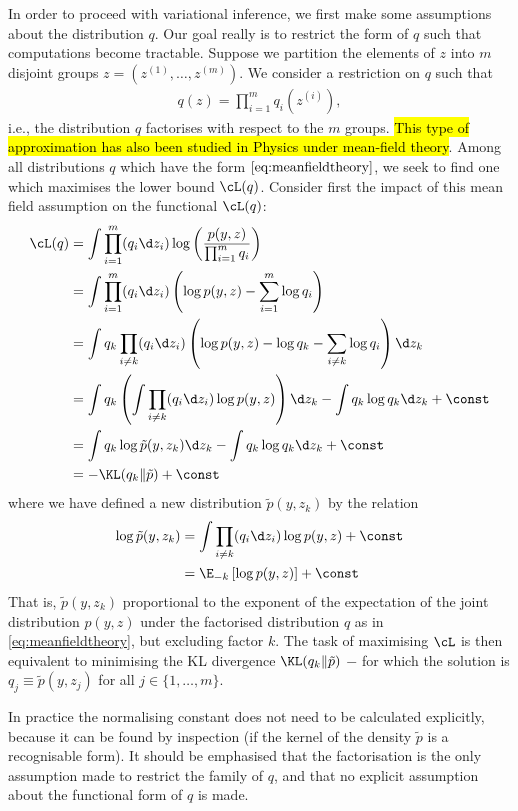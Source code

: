 In order to proceed with variational inference, we first make some assumptions about the distribution $q$. Our goal really is to restrict the form of $q$ such that computations become tractable. Suppose we partition the elements of $z$ into $m$ disjoint groups $z = (z^{(1)}, \dots, z^{(m)})$. We consider a restriction on $q$ such that
\begin{align}\label{eq:meanfieldtheory}
  q(z) = \prod_{i=1}^m q_i(z^{(i)}),
\end{align}
i.e., the distribution $q$ factorises with respect to the $m$ groups. \hl{This type of approximation has also been studied in Physics under mean-field theory}. Among all distributions $q$ which have the form $\eqref{eq:meanfieldtheory}$, we seek to find one which maximises the lower bound $\cL(q)$. Consider first the impact of this mean field assumption on the functional $\cL(q)$:
\begin{align*}
  \cL(q) &= \int \prod_{i=1}^m (q_i \d z_i) \log \left( \frac{p(y,z)}{\prod_{i=1}^m q_i} \right)  \\
  &= \int \prod_{i=1}^m (q_i \d z_i) \left( \log p(y,z) - \sum_{i=1}^m\log  q_i \right) \\
  &= \int q_k \prod_{i \neq k} (q_i \d z_i) \left( \log p(y,z) - \log q_k - \sum_{i \neq k} \log  q_i \right) \d z_k \\
  &= \int q_k  \left(\int \prod_{i \neq k} (q_i \d z_i) \log p(y,z) \right) \d z_k - \int q_k \log q_k  \d z_k + \const \\
  &= \int q_k \log \tilde p(y,z_k) \d z_k - \int q_k \log q_k  \d z_k + \const \\
  &= -\KL (q_k \Vert \tilde p) + \const
\end{align*}
where we have defined a new distribution $\tilde p(y,z_k)$ by the relation
\begin{align*}
  \log \tilde p(y,z_k) 
  &= \int \prod_{i \neq k} (q_i \d z_i) \log p(y,z) + \const \\
  &= \E_{-k}\left[ \log p(y,z) \right] + \const
\end{align*}
That is, $\tilde p(y,z_k)$ proportional to the exponent of the expectation of the joint distribution $p(y,z)$ under the factorised distribution $q$ as in \eqref{eq:meanfieldtheory}, but excluding factor $k$. The task of maximising $\cL$ is then equivalent to minimising the KL divergence $\KL (q_k \Vert \tilde p)$ $-$ for which the solution is $q_j \equiv \tilde p(y,z_j)$ for all $j \in \{1, \dots, m \}$.

In practice the normalising constant does not need to be calculated explicitly, because it can be found by inspection (if the kernel of the density $\tilde p$ is a recognisable form). It should be emphasised that the factorisation is the only assumption made to restrict the family of $q$, and that no explicit assumption about the functional form of $q$ is made.

